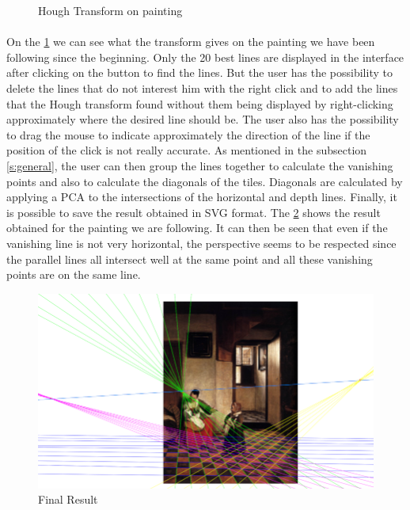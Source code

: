 \documentclass[11pt]{article}
\begin{document}
\begin{figure}[h]
		\caption{Hough Transform on painting}
		\label{im:hough}
	\end{figure}

	\paragraph{}
	On the \figurename \ref{im:hough} we can see what the transform gives on the painting we have been following since the beginning. Only the 20 best lines are displayed in the interface after clicking on the button to find the lines. But the user has the possibility to delete the lines that do not interest him with the right click and to add the lines that the Hough transform found without them being displayed by right-clicking approximately where the desired line should be. The user also has the possibility to drag the mouse to indicate approximately the direction of the line if the position of the click is not really accurate. As mentioned in the subsection \ref{s:general}, the user can then group the lines together to calculate the vanishing points and also to calculate the diagonals of the tiles. Diagonals are calculated by applying a PCA \cite{pca} to the intersections of the horizontal and depth lines. Finally, it is possible to save the result obtained in SVG format. The \figurename \ref{im:final} shows the result obtained for the painting we are following. It can then be seen that even if the vanishing line is not very horizontal, the perspective seems to be respected since the parallel lines all intersect well at the same point and all these vanishing points are on the same line.
	
	\begin{figure}[h]
		\centering
		\includegraphics[scale=1.8]{final.png}
		\caption{Final Result}
		\label{im:final}
	\end{figure}
\end{document}
